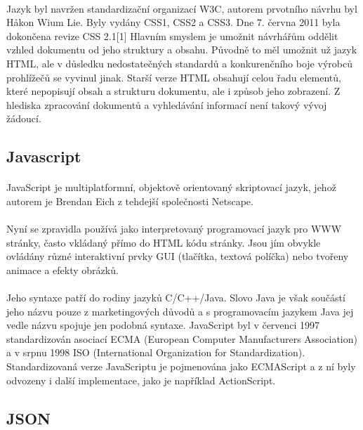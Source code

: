 \paragraph{}
Jazyk byl navržen standardizační organizací W3C, autorem prvotního návrhu byl Håkon Wium Lie. Byly vydány CSS1, CSS2 a CSS3. Dne 7. června 2011 byla dokončena revize CSS 2.1[1] Hlavním smyslem je umožnit návrhářům oddělit vzhled dokumentu od jeho struktury a obsahu. Původně to měl umožnit už jazyk HTML, ale v důsledku nedostatečných standardů a konkurenčního boje výrobců prohlížečů se vyvinul jinak. Starší verze HTML obsahují celou řadu elementů, které nepopisují obsah a strukturu dokumentu, ale i způsob jeho zobrazení. Z hlediska zpracování dokumentů a vyhledávání informací není takový vývoj žádoucí.


\subsection{Javascript}
\paragraph{}
JavaScript je multiplatformní, objektově orientovaný skriptovací jazyk, jehož autorem je Brendan Eich z tehdejší společnosti Netscape.
\paragraph{}
Nyní se zpravidla používá jako interpretovaný programovací jazyk pro WWW stránky, často vkládaný přímo do HTML kódu stránky. Jsou jím obvykle ovládány různé interaktivní prvky GUI (tlačítka, textová políčka) nebo tvořeny animace a efekty obrázků.
\paragraph{}
Jeho syntaxe patří do rodiny jazyků C/C++/Java. Slovo Java je však součástí jeho názvu pouze z marketingových důvodů a s programovacím jazykem Java jej vedle názvu spojuje jen podobná syntaxe. JavaScript byl v červenci 1997 standardizován asociací ECMA (European Computer Manufacturers Association) a v srpnu 1998 ISO (International Organization for Standardization). Standardizovaná verze JavaScriptu je pojmenována jako ECMAScript a z ní byly odvozeny i další implementace, jako je například ActionScript.


\subsection{JSON}
